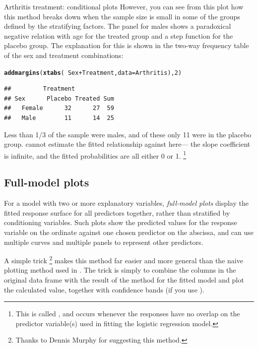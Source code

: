 \documentclass[11pt]{book}\usepackage[]{graphicx}\usepackage[]{color}
\makeatletter
\newcommand{\hlnum}[1]{\textcolor[rgb]{0.686,0.059,0.569}{#1}}%
\newcommand{\hlopt}[1]{\textcolor[rgb]{0,0,0}{#1}}%
\newcommand{\hlstd}[1]{\textcolor[rgb]{0.345,0.345,0.345}{#1}}%
\newcommand{\hlkwc}[1]{\textcolor[rgb]{0.333,0.667,0.333}{#1}}%
\newcommand{\hlkwd}[1]{\textcolor[rgb]{0.737,0.353,0.396}{\textbf{#1}}}%
\newenvironment{kframe}{%
 \def\at@end@of@kframe{}%
 \ifinner\ifhmode%
  \def\at@end@of@kframe{\end{minipage}}%
  \begin{minipage}{\columnwidth}%
 \fi\fi%
 \def\FrameCommand##1{\hskip\@totalleftmargin \hskip-\fboxsep
 \colorbox{shadecolor}{##1}\hskip-\fboxsep
     \hskip-\linewidth \hskip-\@totalleftmargin \hskip\columnwidth}%
 \MakeFramed {\advance\hsize-\width
   \@totalleftmargin\z@ \linewidth\hsize
   \@setminipage}}%
 {\par\unskip\endMakeFramed%
 \at@end@of@kframe}
\newenvironment{knitrout}{}{} %
\renewenvironment{knitrout}{\small\renewcommand{\baselinestretch}{.85}}{} %
\makeatother
\begin{document}
\begin{Example}{Arthritis treatment: conditional plots}
\begin{knitrout}
\end{knitrout}
\noindent However, you can see from this plot how this method breaks down when the sample size is small in some of the groups defined by  the stratifying factors. The panel for males shows a
paradoxical negative relation with age for the treated group and a step function for the 
placebo group.  The explanation for this is shown in the two-way frequency table
of the sex and treatment combinations:
\begin{knitrout}
\color{fgcolor}\begin{kframe}
\begin{alltt}
\hlkwd{addmargins}\hlstd{(}\hlkwd{xtabs}\hlstd{(}\hlopt{~}\hlstd{Sex} \hlopt{+} \hlstd{Treatment,} \hlkwc{data}\hlstd{=Arthritis),} \hlnum{2}\hlstd{)}
\end{alltt}
\begin{verbatim}
##         Treatment
## Sex      Placebo Treated Sum
##   Female      32      27  59
##   Male        11      14  25
\end{verbatim}
\end{kframe}
\end{knitrout}
Less than 1/3 of the sample were males, and of these only 11 were in the placebo group.
 cannot estimate the fitted relationship against  here--- the slope
coefficient is infinite, and the fitted probabilities are all either 0 or 1.%
\footnote{
This is called ,  and occurs whenever the responses have no
overlap on the predictor variable(s) used in fitting the logistic regression model.
}

\end{Example}


\subsection{Full-model plots}\label{sec:logist-fullplots}
For a model with two or more explanatory variables, \emph{full-model plots}
display the fitted response surface for all predictors together, rather than
stratified by conditioning variables.
Such plots show the predicted values for the response variable on the ordinate
against one chosen predictor on the abscissa, and can use multiple curves
and multiple panels to represent other predictors.

A simple \R trick%
\footnote{Thanks to Dennis Murphy for suggesting this method.}
makes this method far easier and more general than the naive plotting method
used in .  The trick is simply to combine the columns in the
original data frame with the result of the  method for the fitted model
and plot the calculated  value, together with confidence bands
(if you use ).
\end{document}
